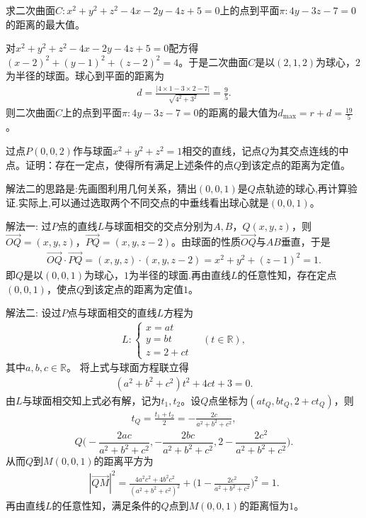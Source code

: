 \documentclass[../../main.tex]{subfiles}%
\begin{document}
\begin{example}
求二次曲面$C: x^2+y^2+z^2-4x-2y-4z+5=0$上的点到平面$\pi:4y-3z-7=0$的距离的最大值。
\end{example}
\begin{solution}

对$x^2+y^2+z^2-4x-2y-4z+5=0$配方得$(x-2)^2+(y-1)^2+(z-2)^2=4$。于是二次曲面$C$是以$(2,1,2)$为球心，$2$为半径的球面。球心到平面的距离为
\begin{align*}
d=\frac{|4\times 1-3\times 2-7|}{\sqrt{4^2+3^2}}=\frac{9}{5}.
\end{align*}
则二次曲面$C$上的点到平面$\pi:4y-3z-7=0$的距离的最大值为$d_{\mathrm{max}}=r+d=\frac{19}{5}$。
\end{solution}

\begin{example}
过点$P(0,0,2)$作与球面$x^2+y^2+z^2=1$相交的直线，记点$Q$为其交点连线的中点。证明：存在一定点，使得所有满足上述条件的点$Q$到该定点的距离为定值。
\end{example}
\begin{note}
解法二的思路是:先画图利用几何关系，猜出$(0,0,1)$是$Q$点轨迹的球心,再计算验证.实际上,可以通过选取两个不同交点的中垂线看出球心就是$(0,0,1)$。
\end{note}
\begin{solution}

{\color{blue}解法一:}
过$P$点的直线$L$与球面相交的交点分别为$A,B$，$Q(x,y,z)$，则$\overrightarrow{OQ}=(x,y,z)$，$\overrightarrow{PQ}=(x,y,z-2)$。由球面的性质$\overrightarrow{OQ}$与$AB$垂直，于是
\begin{align*}
\overrightarrow{OQ}\cdot \overrightarrow{PQ}=(x,y,z)\cdot(x,y,z-2)=x^2+y^2+(z-1)^2=1.
\end{align*}
即$Q$是以$(0,0,1)$为球心，$1$为半径的球面.再由直线$L$的任意性知，存在定点$(0,0,1)$，使点$Q$到该定点的距离为定值$1$。

{\color{blue}解法二:}
设过$P$点与球面相交的直线$L$方程为
\begin{align*}
L:\begin{cases}
x=at\\
y=bt\\
z=2+ct
\end{cases}\quad (t\in\mathbb{R}),
\end{align*}
其中$a,b,c\in\mathbb{R}$。
将上式与球面方程联立得
\begin{align*}
(a^2+b^2+c^2)t^2+4ct+3=0.
\end{align*}
由$L$与球面相交知上式必有解，记为$t_1,t_2$。设$Q$点坐标为$(at_Q,bt_Q,2+ct_Q)$，则
\begin{align*}
t_Q=\frac{t_1+t_2}{2}=-\frac{2c}{a^2+b^2+c^2},
\end{align*}
\[
Q\biggl(-\frac{2ac}{a^2+b^2+c^2},-\frac{2bc}{a^2+b^2+c^2},2-\frac{2c^2}{a^2+b^2+c^2}\biggr).
\]
从而$Q$到$M(0,0,1)$的距离平方为
\begin{align*}
|\overrightarrow{QM}|^2=\frac{4a^2c^2+4b^2c^2}{(a^2+b^2+c^2)^2}+\biggl(1-\frac{2c^2}{a^2+b^2+c^2}\biggr)^2=1.
\end{align*}
再由直线$L$的任意性知，满足条件的$Q$点到$M(0,0,1)$的距离恒为$1$。
\end{solution}
\end{document}
